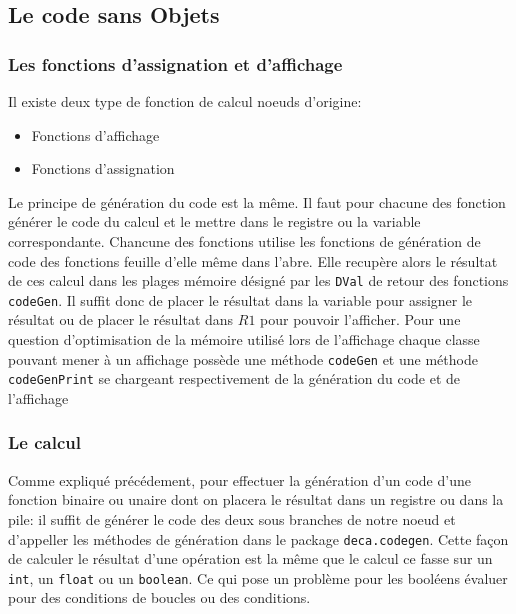 \documentclass{article}
\begin{document}
\subsection{Le code sans Objets}
\subsubsection{Les fonctions d'assignation et d'affichage}
Il existe deux type de fonction de calcul noeuds d'origine:
\begin{itemize}
\item Fonctions d'affichage
\item Fonctions d'assignation 
\end{itemize}
Le principe de génération du code est la même. Il faut pour chacune des fonction générer le code du calcul et le mettre dans le registre ou la variable correspondante. Chancune des fonctions utilise les fonctions de génération de code des fonctions feuille d'elle même dans l'abre. Elle recupère alors le résultat de ces calcul dans les plages mémoire désigné par les \texttt{DVal} de retour des fonctions \texttt{codeGen}. Il suffit donc de placer le résultat dans la variable pour assigner le résultat ou de placer le résultat dans $R1$ pour pouvoir l'afficher. Pour une question d'optimisation de la mémoire utilisé lors de l'affichage chaque classe pouvant mener à un affichage possède une méthode \texttt{codeGen} et une méthode \texttt{codeGenPrint} se chargeant respectivement de la génération du code et  de l'affichage 
\subsubsection{Le calcul}
Comme expliqué précédement, pour effectuer la génération d'un code d'une fonction binaire ou unaire dont on placera le résultat dans un registre ou dans la pile: il suffit de générer le code des deux sous branches de notre noeud et d'appeller les méthodes de génération dans le package \texttt{deca.codegen}. Cette façon de calculer le résultat d'une opération est la même que le calcul ce fasse sur un \texttt{int}, un \texttt{float} ou un \texttt{boolean}. Ce qui pose un problème pour les booléens évaluer pour des conditions de boucles ou des conditions.
\end{document}
